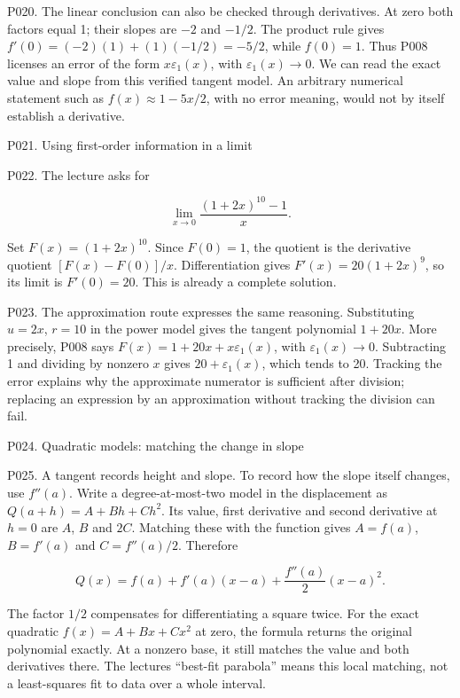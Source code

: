 \documentclass[
  11pt,
]{article}
\begin{document}
P020. The linear conclusion can also be checked through derivatives. At
zero both factors equal 1; their slopes are \(-2\) and \(-1/2\). The
product rule gives \(f'(0)=(-2)(1)+(1)(-1/2)=-5/2\), while \(f(0)=1\).
Thus P008 licenses an error of the form \(x\varepsilon_1(x)\), with
\(\varepsilon_1(x)\to0\). We can read the exact value and slope from
this verified tangent model. An arbitrary numerical statement such as
\(f(x)\approx1-5x/2\), with no error meaning, would not by itself
establish a derivative.

P021. Using first-order information in a limit

P022. The lecture asks for

\[
\lim_{x\to0}\frac{(1+2x)^{10}-1}{x}.
\]

Set \(F(x)=(1+2x)^{10}\). Since \(F(0)=1\), the quotient is the
derivative quotient \([F(x)-F(0)]/x\). Differentiation gives
\(F'(x)=20(1+2x)^9\), so its limit is \(F'(0)=20\). This is already a
complete solution.

P023. The approximation route expresses the same reasoning. Substituting
\(u=2x\), \(r=10\) in the power model gives the tangent polynomial
\(1+20x\). More precisely, P008 says \(F(x)=1+20x+x\varepsilon_1(x)\),
with \(\varepsilon_1(x)\to0\). Subtracting 1 and dividing by nonzero
\(x\) gives \(20+\varepsilon_1(x)\), which tends to 20. Tracking the
error explains why the approximate numerator is sufficient after
division; replacing an expression by an approximation without tracking
the division can fail.

P024. Quadratic models: matching the change in slope

P025. A tangent records height and slope. To record how the slope itself
changes, use \(f''(a)\). Write a degree-at-most-two model in the
displacement as \(Q(a+h)=A+Bh+Ch^2\). Its value, first derivative and
second derivative at \(h=0\) are \(A\), \(B\) and \(2C\). Matching these
with the function gives \(A=f(a)\), \(B=f'(a)\) and \(C=f''(a)/2\).
Therefore

\[
Q(x)=f(a)+f'(a)(x-a)+\frac{f''(a)}2(x-a)^2.
\]

The factor \(1/2\) compensates for differentiating a square twice. For
the exact quadratic \(f(x)=A+Bx+Cx^2\) at zero, the formula returns the
original polynomial exactly. At a nonzero base, it still matches the
value and both derivatives there. The lecture\textquotesingle s
``best-fit parabola'' means this local matching, not a least-squares fit
to data over a whole interval.
\end{document}
